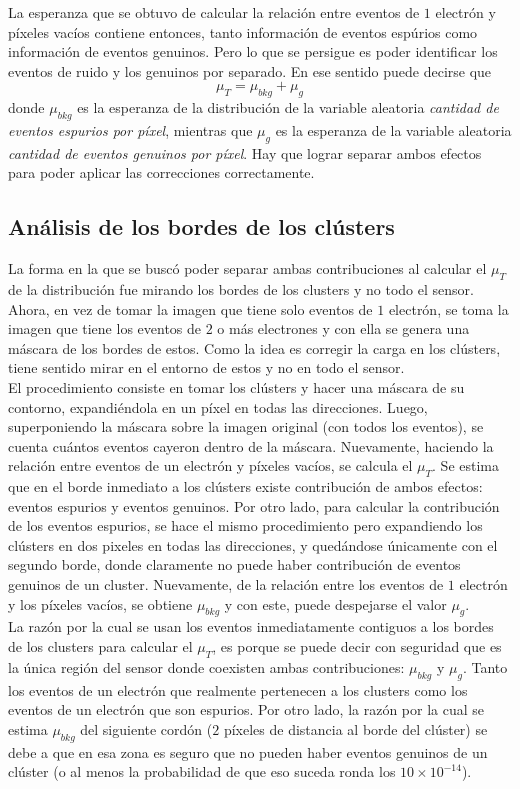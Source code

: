 \indent La esperanza que se obtuvo de calcular la relación entre eventos de $1$ electrón y píxeles vacíos contiene entonces, tanto información de eventos espúrios como información de eventos genuinos. Pero lo que se persigue es poder identificar los eventos de ruido y los genuinos por separado. En ese sentido puede decirse que 
\begin{equation*}
    \mu_{T} = \mu_{bkg} + \mu_{g}
\end{equation*}
donde $\mu_{bkg}$ es la esperanza de la distribución de la variable aleatoria \textit{cantidad de eventos espurios por píxel}, mientras que $\mu_{g}$ es la esperanza de la variable aleatoria \textit{cantidad de eventos genuinos por píxel}. Hay que lograr separar ambos efectos para poder aplicar las correcciones correctamente.

\subsection{Análisis de los bordes de los clústers}
La forma en la que se buscó poder separar ambas contribuciones al calcular el $\mu_{T}$ de la distribución fue mirando los bordes de los clusters y no todo el sensor. Ahora, en vez de tomar la imagen que tiene solo eventos de $1$ electrón, se toma la imagen que tiene los eventos de $2$ o más electrones y con ella se genera una máscara de los bordes de estos. Como la idea es corregir la carga en los clústers, tiene sentido mirar en el entorno de estos y no en todo el sensor.\\
\indent El procedimiento consiste en tomar los clústers y hacer una máscara de su contorno, expandiéndola en un píxel en todas las direcciones. Luego, superponiendo la máscara sobre la imagen original (con todos los eventos), se cuenta cuántos eventos cayeron dentro de la máscara. Nuevamente, haciendo la relación entre eventos de un electrón y píxeles vacíos, se calcula el $\mu_{T}$. Se estima que en el borde inmediato a los clústers existe contribución de ambos efectos: eventos espurios y eventos genuinos. Por otro lado, para calcular la contribución de los eventos espurios, se hace el mismo procedimiento pero expandiendo los clústers en dos pixeles en todas las direcciones, y quedándose únicamente con el segundo borde, donde claramente no puede haber contribución de eventos genuinos de un cluster. Nuevamente, de la relación entre los eventos de $1$ electrón y los píxeles vacíos, se obtiene $\mu_{bkg}$ y con este, puede despejarse el valor $\mu_{g}$.\\
\indent La razón por la cual se usan los eventos inmediatamente contiguos a los bordes de los clusters para calcular el $\mu_{T}$, es porque se puede decir con seguridad que es la única región del sensor donde coexisten ambas contribuciones: $\mu_{bkg}$ y $\mu_{g}$. Tanto los eventos de un electrón que realmente pertenecen a los clusters como los eventos de un electrón que son espurios. Por otro lado, la razón por la cual se estima $\mu_{bkg}$ del siguiente cordón ($2$ píxeles de distancia al borde del clúster) se debe a que en esa zona es seguro que no pueden haber eventos genuinos de un clúster (o al menos la probabilidad de que eso suceda ronda los $10\times 10^{-14}$).\\

